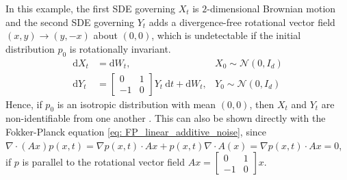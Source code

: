\documentclass[twoside,11pt]{article}
\begin{document}
\begin{ex}
\label{eq: non_identifiability_rotation}

In this example, the first SDE governing $X_t$ is $2$-dimensional Brownian motion and the second SDE governing $Y_t$ adds a divergence-free rotational vector field $(x,y) \to (y, -x)$ about $(0,0)$, which is undetectable if the initial distribution $p_0$ is rotationally invariant.
\begin{align}
    \mathrm{d}X_t &= \mathrm{d}W_t, &X_0 \sim \mathcal{N}(0, I_d)\\
    \mathrm{d}Y_t &= \begin{bmatrix} 0 & 1 \\ -1 & 0  \end{bmatrix}Y_t \: \mathrm{d}t
    + \mathrm{d}W_t, &  Y_0 \sim \mathcal{N}(0, I_d)
\end{align}
Hence, if $p_0$ is an isotropic distribution with mean $(0,0)$, then $X_t$ and $Y_t$ are non-identifiable from one another \citep{shen2024multi}. This can also be shown directly with the Fokker-Planck equation \eqref{eq: FP_linear_additive_noise}, since $\nabla \cdot (Ax) p(x,t) = \nabla p(x,t) \cdot Ax + p(x,t) \nabla \cdot A(x) =  \nabla p(x,t) \cdot Ax = 0$, if $p$ is parallel to the rotational vector field $Ax = \begin{bmatrix} 0 & 1 \\ -1 & 0  \end{bmatrix}x$.
\end{ex}
\end{document}
